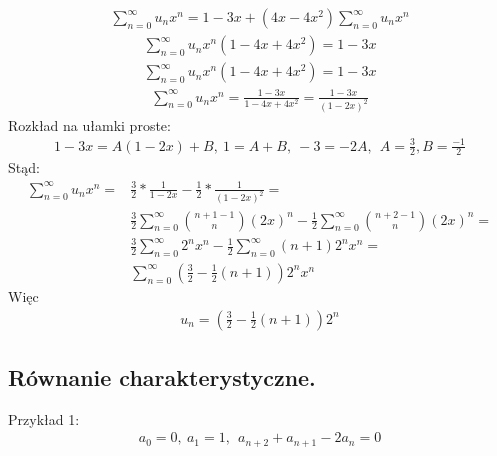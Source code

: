 \documentclass[12pt]{article}
\begin{document}
    \begin{align*}
        \sum_{n=0}^{\infty} u_n x^n = 1 - 3x + (4x - 4x^2) \sum_{n=0}^{\infty} u_n x^n
    \end{align*}
    \begin{align*}
        \sum_{n=0}^{\infty} u_n x^n (1 -  4x + 4x^2) = 1 - 3x
    \end{align*}
    \begin{align*}
        \sum_{n=0}^{\infty} u_n x^n (1 -  4x + 4x^2) = 1 - 3x
    \end{align*}
    \begin{align*}
        \sum_{n=0}^{\infty} u_n x^n = \frac{1 - 3x}{1 -  4x + 4x^2} = \frac{1 - 3x}{(1 - 2x)^2}
    \end{align*}
    Rozkład na ułamki proste:
    \begin{align*}
        1 - 3x = A(1 - 2x) + B, ~ 1 = A + B, ~ -3 = -2A, ~~ A = \frac{3}{2}, B = \frac{-1}{2}
    \end{align*}
    Stąd:
    \begin{align*}
        \sum_{n=0}^{\infty} u_n x^n = &\frac{3}{2} * \frac{1}{1 - 2x} - \frac{1}{2} * \frac{1}{(1 - 2x)^2} =\\
        &\frac{3}{2} \sum_{n=0}^{\infty} \binom{n+1-1}{n} (2x)^n - \frac{1}{2} \sum_{n=0}^{\infty} \binom{n+2-1}{n} (2x)^n =\\
        &\frac{3}{2} \sum_{n=0}^{\infty} 2^n x^n - \frac{1}{2} \sum_{n=0}^{\infty} (n+1) 2^n x^n =\\
        &\sum_{n=0}^{\infty} (\frac{3}{2} - \frac{1}{2}(n+1)) 2^n x^n
    \end{align*}
    Więc
    \begin{align*}
        u_n = (\frac{3}{2} - \frac{1}{2}(n+1)) 2^n
    \end{align*}


    \subsection{Równanie charakterystyczne.}
    Przykład 1:
    \begin{align*}
        a_0 = 0, ~ a_1 = 1, ~~ a_{n+2} + a_{n+1} - 2 a_n = 0
    \end{align*}
\end{document}
